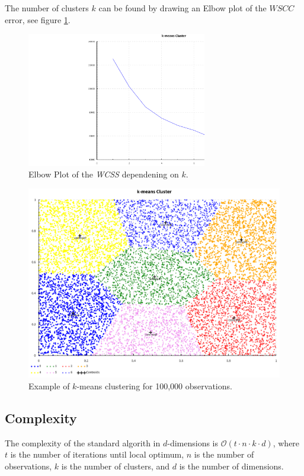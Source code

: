 \documentclass[12pt, a4paper]{article} %
\begin{document}
The number of clusters $k$ can be found by drawing an Elbow plot of the $WSCC$ error, see figure \ref{fig:elbow}.

\begin{figure}[h]
\includegraphics[width=0.7\textwidth]{elbow}
  \caption{Elbow Plot of the \textit{WCSS} dependening on $k$.}
\label{fig:elbow}
\end{figure}

\begin{figure}[h]
\includegraphics[width=1\textwidth]{kmeans}
\centering
\caption{Example of $k$-means clustering for 100,000 observations.}
\label{fig:kmeans}
\end{figure}

\subsection{Complexity}\label{s:algo}

The complexity of the standard algorith in $d$-dimensions is $\mathcal{O}(t \cdot n \cdot k \cdot d)$, where $t$ is the number of iterations until local optimum, $n$ is the number of observations, $k$ is the number of clusters, and $d$ is the number of dimensions.
\end{document}
